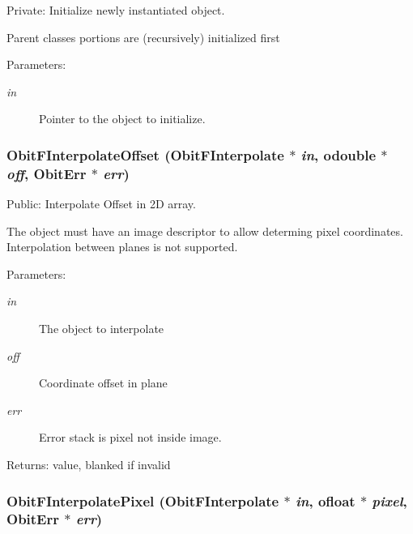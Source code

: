 Private: Initialize newly instantiated object. 

Parent classes portions are (recursively) initialized first \begin{Desc}
\item[Parameters:]
\begin{description}
\item[{\em in}]Pointer to the object to initialize. \end{description}
\end{Desc}
\subsubsection{ Obit\-FInterpolate\-Offset ({\bf Obit\-FInterpolate} $\ast$ {\em in}, {\bf odouble} $\ast$ {\em off}, {\bf Obit\-Err} $\ast$ {\em err})}\label{ObitFInterpolate_8c_a16}


Public: Interpolate Offset in 2D array. 

The object must have an image descriptor to allow determing pixel coordinates. Interpolation between planes is not supported. \begin{Desc}
\item[Parameters:]
\begin{description}
\item[{\em in}]The object to interpolate \item[{\em off}]Coordinate offset in plane \item[{\em err}]Error stack is pixel not inside image. \end{description}
\end{Desc}
\begin{Desc}
\item[Returns:]value, blanked if invalid \end{Desc}
\subsubsection{ Obit\-FInterpolate\-Pixel ({\bf Obit\-FInterpolate} $\ast$ {\em in}, {\bf ofloat} $\ast$ {\em pixel}, {\bf Obit\-Err} $\ast$ {\em err})}\label{ObitFInterpolate_8c_a13}


